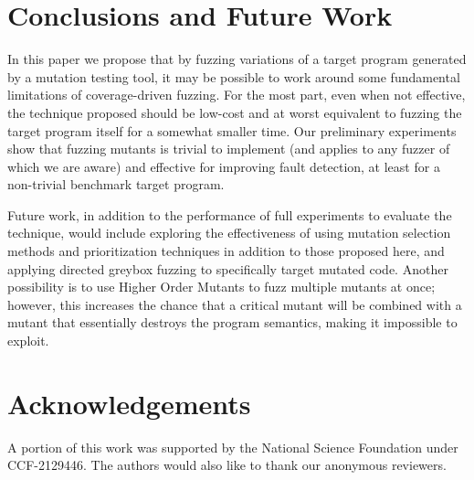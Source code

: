 \section{Conclusions and Future Work}

In this paper we propose that by fuzzing variations of a target program generated by a mutation testing tool, it may be possible to work around some fundamental limitations of coverage-driven fuzzing.  For the most part, even when not effective, the technique proposed should be low-cost and at worst equivalent to fuzzing the target program itself for a somewhat smaller time.  Our preliminary experiments show that fuzzing mutants is trivial to implement (and applies to any fuzzer of which we are aware) and effective for improving fault detection, at least for a non-trivial benchmark target program.

Future work, in addition to the performance of full experiments to evaluate the technique, would include exploring the effectiveness of using mutation selection methods and prioritization techniques in addition to those proposed here, and applying directed greybox fuzzing \cite{AFLGo} to specifically target mutated code.  Another possibility is to use Higher Order Mutants \cite{HOM} to fuzz multiple mutants at once; however, this increases the chance that a critical mutant will be combined with a mutant that essentially destroys the program semantics, making it impossible to exploit.

\section*{Acknowledgements}
\begin{sloppypar}
  A portion of this work was
  supported by the National Science Foundation under CCF-2129446.  The
authors would also like to thank our anonymous reviewers.
\end{sloppypar}

